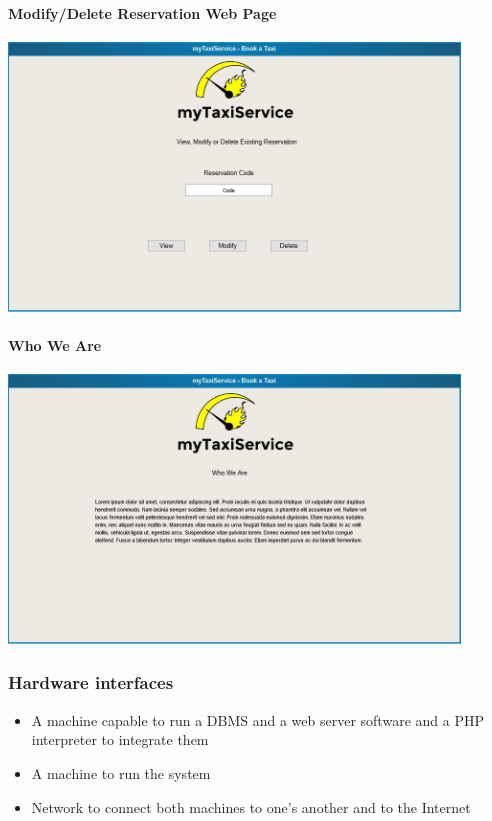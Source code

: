 		\paragraph{Modify/Delete Reservation Web Page}
		\begin{center}
			\includegraphics[width=0.90\textwidth]{./images/modify_delete_reservation}
		\end{center}
		\paragraph{Who We Are}
		\begin{center}
			\includegraphics[width=0.90\textwidth]{./images/who_we_are}
		\end{center}
		\subsubsection{Hardware interfaces}
		\begin{itemize}
			\item A machine capable to run a DBMS and a web server software and a PHP interpreter to integrate them
			\item A machine to run the system
			\item Network to connect both machines to one's another and to the Internet
		\end{itemize}
